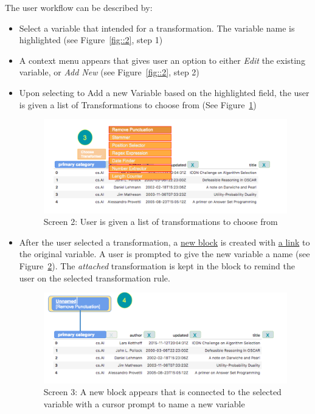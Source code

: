 \documentclass[12pt,letterpaper]{article}
\begin{document}
The user workflow can be described by: 

\begin{itemize}
    \item Select a variable that intended for a transformation. The variable name is highlighted (see Figure~\ref{fig::2}, step 1)
    \item A context menu appears that gives user an option to either \textit{Edit} the existing variable, or \textit{Add New}  (see Figure~\ref{fig::2}, step 2)
    \item Upon selecting to Add a new Variable based on the highlighted field, the user is given a list of Transformations to choose from (See Figure~\ref{fig::3})
    
\begin{figure}[h]
\centering
\includegraphics[scale=.3]{figures/m3/wireframe-screen2.png}
\caption{Screen 2: User is given a list of transformations to choose from}
\label{fig::3}
\end{figure}

    \item After the user selected a transformation, a \underline{new block} is created with \underline{a link} to the original variable. A user is prompted to give the new variable a name (see Figure~\ref{fig::4}). The \textit{attached} transformation is kept in the block to remind the user on the selected transformation rule. 
    
    
\begin{figure}[h]
\centering
\includegraphics[scale=.3]{figures/m3/wireframe-screen3.png}
\caption{Screen 3: A new block appears that is connected to the selected variable with a cursor prompt to name a new variable}
\label{fig::4}
\end{figure}


\end{itemize}
\end{document}
